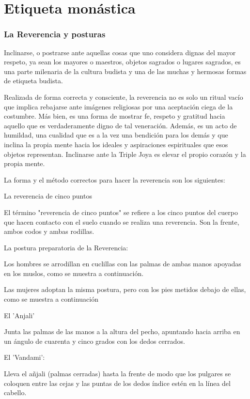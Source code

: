 \chapter*{Etiqueta monástica}
\label{etiquette}

\subsection{La Reverencia y posturas}

Inclinarse, o postrarse ante aquellas cosas que uno considera dignas del mayor respeto, ya sean los mayores o maestros, objetos sagrados o lugares sagrados, es una parte milenaria de la cultura budista y una de las muchas y hermosas formas de etiqueta budista.

Realizada de forma correcta y consciente, la reverencia no es solo un ritual vacío que implica rebajarse ante imágenes religiosas por una aceptación ciega de la costumbre. Más bien, es una forma de mostrar fe, respeto y gratitud hacia aquello que es verdaderamente digno de tal veneración. Además, es un acto de humildad, una cualidad que es a la vez una bendición para los demás y que inclina la propia mente hacia los ideales y aspiraciones espirituales que esos objetos representan. Inclinarse ante la Triple Joya es elevar el propio corazón y la propia mente.

La forma y el método correctos para hacer la reverencia son los siguientes:

La reverencia de cinco puntos

El término "reverencia de cinco puntos" se refiere a los cinco puntos del cuerpo que hacen contacto con el suelo cuando se realiza una reverencia. Son la frente, ambos codos y ambas rodillas.

La postura preparatoria de la  Reverencia:

Los hombres se arrodillan en cuclillas con las palmas de ambas manos apoyadas en los muslos, como se muestra a continuación.

Las mujeres adoptan la misma postura, pero con los pies metidos debajo de ellas, como se muestra a continuación


El 'Anjali'

Junta las palmas de las manos a la altura del pecho, apuntando hacia arriba en un ángulo de cuarenta y cinco grados con los dedos cerrados.

El 'Vandami':

Lleva el añjali (palmas cerradas) hasta la frente de modo que los pulgares se coloquen entre las cejas y las puntas de los dedos índice estén en la línea del cabello.

